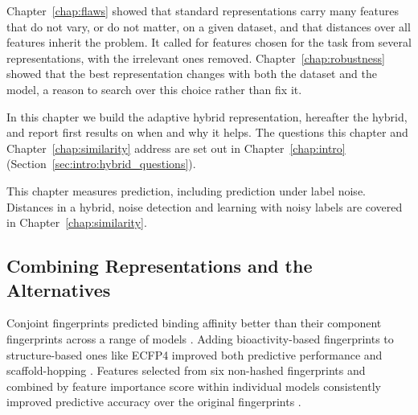 Chapter~\ref{chap:flaws} showed that standard representations carry many features that do not vary, or do not matter, on a given dataset, and that distances over all features inherit the problem. It called for features chosen for the task from several representations, with the irrelevant ones removed. Chapter~\ref{chap:robustness} showed that the best representation changes with both the dataset and the model, a reason to search over this choice rather than fix it.

In this chapter we build the adaptive hybrid representation, hereafter the hybrid, and report first results on when and why it helps. The questions this chapter and Chapter~\ref{chap:similarity} address are set out in Chapter~\ref{chap:intro} (Section~\ref{sec:intro:hybrid_questions}).

This chapter measures prediction, including prediction under label noise. Distances in a hybrid, noise detection and learning with noisy labels are covered in Chapter~\ref{chap:similarity}.



\subsection{Combining Representations and the Alternatives}

Conjoint fingerprints predicted binding affinity better than their component fingerprints across a range of models \citep{Xie2020}. Adding bioactivity-based fingerprints to structure-based ones like ECFP4 improved both predictive performance and scaffold-hopping \citep{Laufktter2019}. Features selected from six non-hashed fingerprints and combined by feature importance score within individual models consistently improved predictive accuracy over the original fingerprints \citep{Turkina2025}.

